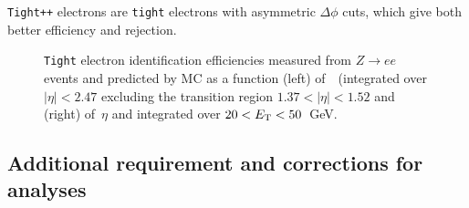 \texttt{Tight++} electrons are \texttt{tight} electrons with asymmetric $\Delta\phi$ cuts, which give
both better efficiency and rejection.

\begin{figure}[tb]\begin{center}
	\caption{\texttt{Tight} electron identification efficiencies measured from $Z\to ee$ events and predicted by MC as a function (left) of~\ET\ (integrated over $|\eta|< 2.47$ excluding the transition region $1.37< |\eta|<1.52$ and (right) of~$\eta$ and integrated over $20< \ET<50$~GeV.~\cite{eperf}\label{fig:eleeff}}
\end{center}\end{figure}


\subsection{Additional requirement and corrections for analyses}

